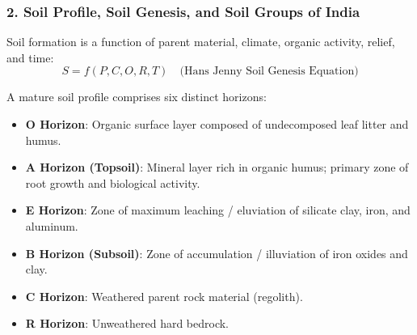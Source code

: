 \documentclass[11pt,a4paper]{article}
\begin{document}
\subsubsection{2. Soil Profile, Soil Genesis, and Soil Groups of India}
Soil formation is a function of parent material, climate, organic activity, relief, and time:
\begin{equation}
  S = f(P, C, O, R, T) \quad \text{(Hans Jenny Soil Genesis Equation)}
\end{equation}

A mature soil profile comprises six distinct horizons:
\begin{itemize}[leftmargin=*]
  \item \textbf{O Horizon}: Organic surface layer composed of undecomposed leaf litter and humus.
  \item \textbf{A Horizon (Topsoil)}: Mineral layer rich in organic humus; primary zone of root growth and biological activity.
  \item \textbf{E Horizon}: Zone of maximum leaching / eluviation of silicate clay, iron, and aluminum.
  \item \textbf{B Horizon (Subsoil)}: Zone of accumulation / illuviation of iron oxides and clay.
  \item \textbf{C Horizon}: Weathered parent rock material (regolith).
  \item \textbf{R Horizon}: Unweathered hard bedrock.
\end{itemize}
\end{document}
